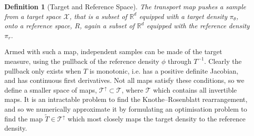 \documentclass[final]{siamltex}
\newcommand{\edit}[1]{{\color{red} #1}}
\newtheorem{dfn}{Definition}[section]
\begin{document}
\begin{dfn}[Target and Reference Space]
	The transport map pushes a sample from a {\it target space} $\mathcal{X}$, that is a subset of $\mathbb{R}^d$ equipped with a target density $\pi_{\theta}$, onto a {\it reference space}, $R$, again a subset of $\mathbb{R}^d$ equipped with the reference density $\pi_r$.
\end{dfn}

Armed with such a map, independent samples can be made of the target
measure, using the pullback of the reference density $\phi$ through $T^{-1}$.
Clearly the pullback only exists when $T$ is monotonic, i.e. has a positive definite Jacobian, and has continuous first derivatives.
Not all maps satisfy these conditions, so we define a smaller space of
maps, $\mathcal{T}^\uparrow \subset \mathcal{T}$, \edit{ where $\mathcal{T}$ which contains all
invertible maps. It is an intractable problem to find the
  Knothe–Rosenblatt rearrangement, and so we numerically approximate
  it by formulating an optimisation problem to find the map $\tilde{T}
\in \mathcal{T}^\uparrow$ which most closely maps the target density
to the reference density.}

\end{document}
